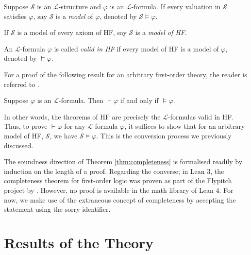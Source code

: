 \begin{definition}
    \label{def:models+Model+valid}
    \leanok
    Suppose $\mathcal{S}$ is an $\mathcal{L}$-structure and $\varphi$ is an $\mathcal{L}$-formula.
    If every valuation in $\mathcal{S}$ satisfies $\varphi$, 
    say $\mathcal{S}$ is a \textit{model} of $\varphi$, denoted by $\mathcal{S} \vDash \varphi$.

    If $\mathcal{S}$ is a model of every axiom of HF, say $\mathcal{S}$ is a \textit{model of HF}.
    
    An $\mathcal{L}$-formula $\varphi$ is called \textit{valid in HF} if 
    every model of HF is a model of $\varphi$, denoted by $\vDash \varphi$.
\end{definition}

For a proof of the following result for an arbitrary first-order theory, 
the reader is referred to  \cite{shoenfield1967mathematical}.

\begin{theorem}
    \label{thm:completeness}
    \leanok
    Suppose $\varphi$ is an $\mathcal{L}$-formula.
    Then $\vdash \varphi$ if and only if $\vDash \varphi$.
\end{theorem}

In other words, the theorems of HF are precisely the $\mathcal{L}$-formulas valid in HF.
Thus, to prove $\vdash \varphi$ for any $\mathcal{L}$-formula $\varphi$, it suffices to show that for an 
arbitrary model of HF, $\mathcal{S}$, we have $\mathcal{S} \vDash \varphi$.
This is the conversion process we previously discussed.

The soundness direction of Theorem \ref{thm:completeness} is formalised readily
by induction on the length of a proof.
Regarding the converse; in Lean 3, the completeness theorem for first-order logic was proven 
as part of the Flypitch project by \cite{han2020formal}.
However, no proof is available in the math library of Lean 4.
For now, we make use of the extraneous concept of completeness 
by accepting the statement using the {\ttfamily \small sorry} identifier. 

\chapter{Results of the Theory}

